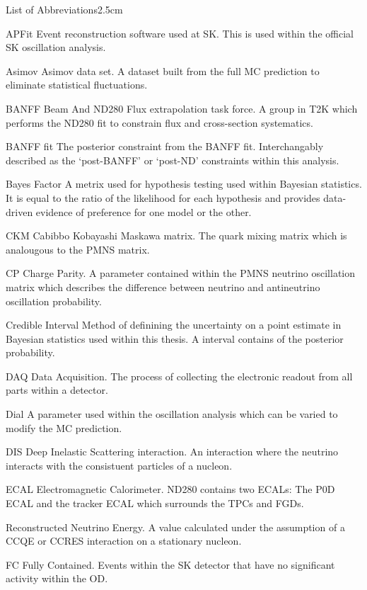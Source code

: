 \begin{mclistof}{List of Abbreviations}{2.5cm}

\item[APFit]Event reconstruction software used at SK. This is used within the official SK oscillation analysis.
\item[Asimov]Asimov data set. A dataset built from the full MC prediction to eliminate statistical fluctuations.
\item[BANFF]Beam And ND280 Flux extrapolation task force. A group in T2K which performs the ND280 fit to constrain flux and cross-section systematics. 
\item[BANFF fit]The posterior constraint from the BANFF fit. Interchangably described as the `post-BANFF' or `post-ND' constraints within this analysis.
\item[Bayes Factor]A metrix used for hypothesis testing used within Bayesian statistics. It is equal to the ratio of the likelihood for each hypothesis and provides data-driven evidence of preference for one model or the other.
\item[CKM]Cabibbo Kobayashi Maskawa matrix. The quark mixing matrix which is analougous to the PMNS matrix.
\item[CP]Charge Parity. A parameter contained within the PMNS neutrino oscillation matrix which describes the difference between neutrino and antineutrino oscillation probability.
\item[Credible Interval]Method of definining the uncertainty on a point estimate in Bayesian statistics used within this thesis. A  interval contains  of the posterior probability.
\item[DAQ]Data Acquisition. The process of collecting the electronic readout from all parts within a detector.
\item[Dial]A parameter used within the oscillation analysis which can be varied to modify the MC prediction.
\item[DIS]Deep Inelastic Scattering interaction. An interaction where the neutrino interacts with the consistuent particles of a nucleon.
\item[ECAL]Electromagnetic Calorimeter. ND280 contains two ECALs: The P0D ECAL and the tracker ECAL which surrounds the TPCs and FGDs.
\item[\quickmath{E_{rec}}]Reconstructed Neutrino Energy. A value calculated under the assumption of a CCQE or CCRES interaction on a stationary nucleon.
\item[FC]Fully Contained. Events within the SK detector that have no significant activity within the OD.

\end{mclistof}
